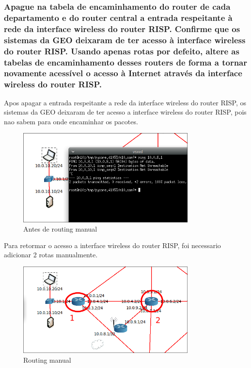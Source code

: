 \documentclass{article}
\begin{document}
\subsubsection{Apague na tabela de encaminhamento do router de cada departamento e do
router central a entrada respeitante à rede da interface wireless do router RISP.
Confirme que os sistemas da GEO deixaram de ter acesso à interface wireless do
router RISP. Usando apenas rotas por defeito, altere as tabelas de
encaminhamento desses routers de forma a tornar novamente acessível o acesso
à Internet através da interface wireless do router RISP.}

Apos apagar a entrada respeitante a rede da interface wireless do router RISP, os sistemas da GEO deixaram de ter acesso a interface wireless do router RISP, pois nao sabem para onde encaminhar os pacotes.
\begin{figure}[h]
    \centering
    \includegraphics[width=0.8\textwidth]{images/before-route.png}
    \caption{\label{fig:before_route}Antes de routing manual}
\end{figure}

Para retormar o acesso a interface wireless do router RISP, foi necessario adicionar 2 rotas manualmente.
\begin{figure}[h]
    \centering
    \includegraphics[width=0.8\textwidth]{images/route.png}
    \caption{\label{fig:route}Routing manual}
\end{figure}
\end{document}
